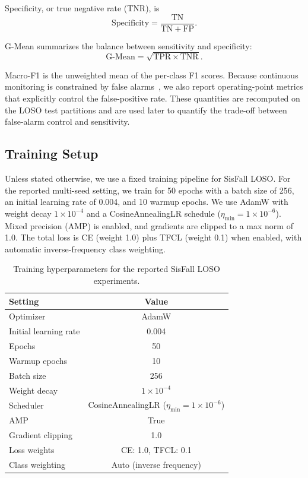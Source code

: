 \documentclass[jec]{acnsart}
\begin{document}
Specificity, or true negative rate (TNR), is
\begin{equation}
\label{eq:specificity}
\mathrm{Specificity} = \frac{\mathrm{TN}}{\mathrm{TN} + \mathrm{FP}}.
\end{equation}

G-Mean summarizes the balance between sensitivity and specificity:
\begin{equation}
\label{eq:gmean}
\mathrm{G\text{-}Mean} = \sqrt{\mathrm{TPR} \times \mathrm{TNR}}.
\end{equation}

Macro-F1 is the unweighted mean of the per-class F1 scores. Because continuous monitoring is constrained by false alarms~\cite{Cvach2012AlarmFatigue}, we also report operating-point metrics that explicitly control the false-positive rate. These quantities are recomputed on the LOSO test partitions and are used later to quantify the trade-off between false-alarm control and sensitivity.

\subsection{Training Setup}

Unless stated otherwise, we use a fixed training pipeline for SisFall LOSO. For the reported multi-seed setting, we train for 50 epochs with a batch size of 256, an initial learning rate of 0.004, and 10 warmup epochs. We use AdamW with weight decay $1{\times}10^{-4}$ and a CosineAnnealingLR schedule ($\eta_{\min}{=}1{\times}10^{-6}$). Mixed precision (AMP) is enabled, and gradients are clipped to a max norm of 1.0. The total loss is CE (weight 1.0) plus TFCL (weight 0.1) when enabled, with automatic inverse-frequency class weighting.

\begin{table}[htbp]
\caption{Training hyperparameters for the reported SisFall LOSO experiments.}
\label{tab:train_setup}
\centering
\small
\setlength{\tabcolsep}{4pt}
\begin{tabular}{lc}
\toprule
Setting & Value \\
\midrule
Optimizer & AdamW \\
Initial learning rate & 0.004 \\
Epochs & 50 \\
Warmup epochs & 10 \\
Batch size & 256 \\
Weight decay & $1{\times}10^{-4}$ \\
Scheduler & CosineAnnealingLR ($\eta_{\min}{=}1{\times}10^{-6}$) \\
AMP & True \\
Gradient clipping & 1.0 \\
Loss weights & CE: 1.0, TFCL: 0.1 \\
Class weighting & Auto (inverse frequency) \\
\bottomrule
\end{tabular}
\end{table}
\end{document}
